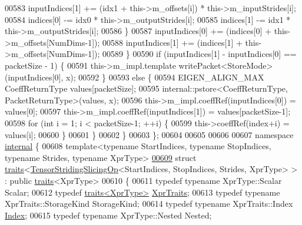 \begin{DoxyCode}
00583         inputIndices[1] += (idx1 + this->m\_offsets[i]) * this->m\_inputStrides[i];
00584         indices[0] -= idx0 * this->m\_outputStrides[i];
00585         indices[1] -= idx1 * this->m\_outputStrides[i];
00586       \}
00587       inputIndices[0] += (indices[0] + this->m\_offsets[NumDims-1]);
00588       inputIndices[1] += (indices[1] + this->m\_offsets[NumDims-1]);
00589     \}
00590     \textcolor{keywordflow}{if} (inputIndices[1] - inputIndices[0] == packetSize - 1) \{
00591       this->m\_impl.template writePacket<StoreMode>(inputIndices[0], x);
00592     \}
00593     \textcolor{keywordflow}{else} \{
00594       EIGEN\_ALIGN\_MAX CoeffReturnType values[packetSize];
00595       internal::pstore<CoeffReturnType, PacketReturnType>(values, x);
00596       this->m\_impl.coeffRef(inputIndices[0]) = values[0];
00597       this->m\_impl.coeffRef(inputIndices[1]) = values[packetSize-1];
00598       \textcolor{keywordflow}{for} (\textcolor{keywordtype}{int} i = 1; i < packetSize-1; ++i) \{
00599         this->coeffRef(index+i) = values[i];
00600       \}
00601     \}
00602   \}
00603 \};
00604 
00605 
00606 
00607 \textcolor{keyword}{namespace }\hyperlink{namespaceinternal}{internal} \{
00608 \textcolor{keyword}{template}<\textcolor{keyword}{typename} StartIndices, \textcolor{keyword}{typename} StopIndices, \textcolor{keyword}{typename} Str\textcolor{keywordtype}{id}es, \textcolor{keyword}{typename} XprType>
\hyperlink{struct_eigen_1_1internal_1_1traits_3_01_tensor_striding_slicing_op_3_01_start_indices_00_01_stop9ad1ed36f680305576abbd4a33c38a6e}{00609} \textcolor{keyword}{struct }\hyperlink{struct_eigen_1_1internal_1_1traits}{traits}<\hyperlink{class_eigen_1_1_tensor_striding_slicing_op}{TensorStridingSlicingOp}<StartIndices, StopIndices, Strides, 
      XprType> > : \textcolor{keyword}{public} \hyperlink{struct_eigen_1_1internal_1_1traits}{traits}<XprType>
00610 \{
00611   \textcolor{keyword}{typedef} \textcolor{keyword}{typename} XprType::Scalar Scalar;
00612   \textcolor{keyword}{typedef} \hyperlink{struct_eigen_1_1internal_1_1traits}{traits<XprType>} \hyperlink{struct_eigen_1_1internal_1_1traits}{XprTraits};
00613   \textcolor{keyword}{typedef} \textcolor{keyword}{typename} XprTraits::StorageKind StorageKind;
00614   \textcolor{keyword}{typedef} \textcolor{keyword}{typename} XprTraits::Index \hyperlink{namespace_eigen_a62e77e0933482dafde8fe197d9a2cfde}{Index};
00615   \textcolor{keyword}{typedef} \textcolor{keyword}{typename} XprType::Nested Nested;

\end{DoxyCode}
